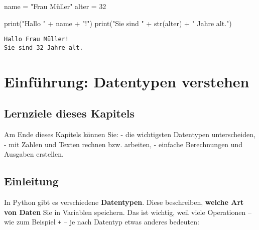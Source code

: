 \documentclass[
  letterpaper,
  DIV=11,
  numbers=noendperiod]{scrreprt}
\newenvironment{Shaded}{\begin{snugshade}}{\end{snugshade}}
\newcommand{\BuiltInTok}[1]{\textcolor[rgb]{0.00,0.23,0.31}{#1}}
\newcommand{\DecValTok}[1]{\textcolor[rgb]{0.68,0.00,0.00}{#1}}
\newcommand{\NormalTok}[1]{\textcolor[rgb]{0.00,0.23,0.31}{#1}}
\newcommand{\OperatorTok}[1]{\textcolor[rgb]{0.37,0.37,0.37}{#1}}
\newcommand{\StringTok}[1]{\textcolor[rgb]{0.13,0.47,0.30}{#1}}
\begin{document}
\begin{tcolorbox}
\begin{tcolorbox}[enhanced jigsaw, breakable, opacityback=0, left=2mm, coltitle=black, leftrule=.75mm, colframe=quarto-callout-caution-color-frame, opacitybacktitle=0.6, toprule=.15mm, bottomtitle=1mm, titlerule=0mm, toptitle=1mm, title={Lösung}, colbacktitle=quarto-callout-caution-color!10!white, arc=.35mm, bottomrule=.15mm, rightrule=.15mm, colback=white]

\begin{Shaded}
\begin{Highlighting}[]
\NormalTok{name }\OperatorTok{=} \StringTok{"Frau Müller"}
\NormalTok{alter }\OperatorTok{=} \DecValTok{32}

\BuiltInTok{print}\NormalTok{(}\StringTok{"Hallo "} \OperatorTok{+}\NormalTok{ name }\OperatorTok{+} \StringTok{"!"}\NormalTok{)}
\BuiltInTok{print}\NormalTok{(}\StringTok{"Sie sind "} \OperatorTok{+} \BuiltInTok{str}\NormalTok{(alter) }\OperatorTok{+} \StringTok{" Jahre alt."}\NormalTok{)}
\end{Highlighting}
\end{Shaded}

\begin{verbatim}
Hallo Frau Müller!
Sie sind 32 Jahre alt.
\end{verbatim}

\end{tcolorbox}

\end{tcolorbox}

\chapter{Einführung: Datentypen
verstehen}\label{einfuxfchrung-datentypen-verstehen}

\section{Lernziele dieses Kapitels}\label{lernziele-dieses-kapitels-1}

Am Ende dieses Kapitels können Sie: - die wichtigsten Datentypen
unterscheiden, - mit Zahlen und Texten rechnen bzw. arbeiten, - einfache
Berechnungen und Ausgaben erstellen.

\section{Einleitung}\label{einleitung}

In Python gibt es verschiedene \textbf{Datentypen}. Diese beschreiben,
\textbf{welche Art von Daten} Sie in Variablen speichern. Das ist
wichtig, weil viele Operationen -- wie zum Beispiel \texttt{+} -- je
nach Datentyp etwas anderes bedeuten:
\end{document}
